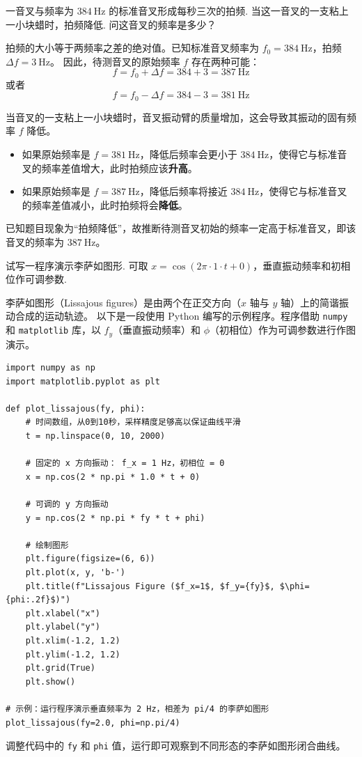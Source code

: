 \begin{exercise}\label{ex:2.9}
一音叉与频率为 $384 \ \mathrm{Hz}$ 的标准音叉形成每秒三次的拍频. 当这一音叉的一支粘上一小块蜡时，拍频降低. 问这音叉的频率是多少？
\end{exercise}
\begin{solution}
拍频的大小等于两频率之差的绝对值。已知标准音叉频率为 $f_0 = 384 \ \mathrm{Hz}$，拍频 $\Delta f = 3 \ \mathrm{Hz}$。
因此，待测音叉的原始频率 $f$ 存在两种可能：
$$ f = f_0 + \Delta f = 384 + 3 = 387 \ \mathrm{Hz} $$
或者
$$ f = f_0 - \Delta f = 384 - 3 = 381 \ \mathrm{Hz} $$

当音叉的一支粘上一小块蜡时，音叉振动臂的质量增加，这会导致其振动的固有频率 $f$ 降低。
\begin{itemize}
    \item 如果原始频率是 $f = 381 \ \mathrm{Hz}$，降低后频率会更小于 $384 \ \mathrm{Hz}$，使得它与标准音叉的频率差值增大，此时拍频应该\textbf{升高}。
    \item 如果原始频率是 $f = 387 \ \mathrm{Hz}$，降低后频率将接近 $384 \ \mathrm{Hz}$，使得它与标准音叉的频率差值减小，此时拍频将会\textbf{降低}。
\end{itemize}

已知题目现象为“拍频降低”，故推断待测音叉初始的频率一定高于标准音叉，即该音叉的频率为 $387 \ \mathrm{Hz}$。
\end{solution}

\begin{exercise}\label{ex:2.10}
试写一程序演示李萨如图形. 可取 $x=\cos(2\pi \cdot 1 \cdot t+0)$，垂直振动频率和初相位作可调参数.
\end{exercise}
\begin{solution}
李萨如图形（Lissajous figures）是由两个在正交方向（$x$ 轴与 $y$ 轴）上的简谐振动合成的运动轨迹。
以下是一段使用 Python 编写的示例程序。程序借助 \texttt{numpy} 和 \texttt{matplotlib} 库，以 $f_y$（垂直振动频率）和 $\phi$（初相位）作为可调参数进行作图演示。

\begin{verbatim}
import numpy as np
import matplotlib.pyplot as plt

def plot_lissajous(fy, phi):
    # 时间数组，从0到10秒，采样精度足够高以保证曲线平滑
    t = np.linspace(0, 10, 2000)
    
    # 固定的 x 方向振动： f_x = 1 Hz，初相位 = 0
    x = np.cos(2 * np.pi * 1.0 * t + 0)
    
    # 可调的 y 方向振动
    y = np.cos(2 * np.pi * fy * t + phi)
    
    # 绘制图形
    plt.figure(figsize=(6, 6))
    plt.plot(x, y, 'b-')
    plt.title(f"Lissajous Figure ($f_x=1$, $f_y={fy}$, $\phi={phi:.2f}$)")
    plt.xlabel("x")
    plt.ylabel("y")
    plt.xlim(-1.2, 1.2)
    plt.ylim(-1.2, 1.2)
    plt.grid(True)
    plt.show()

# 示例：运行程序演示垂直频率为 2 Hz，相差为 pi/4 的李萨如图形
plot_lissajous(fy=2.0, phi=np.pi/4)
\end{verbatim}

调整代码中的 \texttt{fy} 和 \texttt{phi} 值，运行即可观察到不同形态的李萨如图形闭合曲线。
\end{solution}

